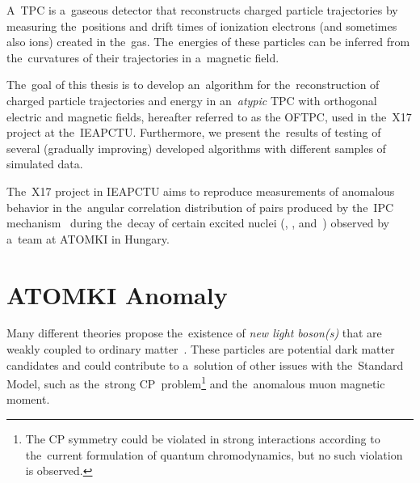\setcounter{equation}{0}
\setcounter{figure}{0}
\renewcommand{\theequation}{\thechapter.\arabic{equation}}
\renewcommand{\thefigure}{\thechapter.\arabic{figure}}
	A~\ac{TPC}\red{~[refs]} is a~gaseous detector that reconstructs charged particle trajectories by measuring the~positions and drift times of ionization electrons (and sometimes also ions) created in the~gas. The~energies of these particles can be inferred from the~curvatures of their trajectories in a~magnetic field.
	
	The~goal of this thesis is to develop an~algorithm for the~reconstruction of charged particle trajectories and energy in an~\emph{atypic} \ac{TPC} with orthogonal electric and magnetic fields, hereafter referred to as the \ac{OFTPC}, used in the~X17 project at the~\ac{IEAPCTU}. Furthermore, we present the~results of testing of several (gradually improving) developed algorithms with different samples of simulated data.
	
	The~X17 project in \ac{IEAPCTU} aims to reproduce measurements of anomalous behavior in the~angular correlation distribution of pairs produced by the~\ac{IPC} mechanism~\cite{IPC} during the~decay of certain excited nuclei (, , and~) observed by a~team at ATOMKI in Hungary.
	
	
	\section{ATOMKI Anomaly}
	\label{sec:ATOMKI}
		Many different theories propose the~existence of \emph{new light boson(s)} that are weakly coupled to ordinary matter~\cite{dark}. These particles are potential dark matter candidates and could contribute to a~solution of other issues with the~Standard Model, such as the~strong CP~problem\footnote{The CP symmetry could be violated in strong interactions according to the~current formulation of quantum chromodynamics, but no such violation is observed.} and the~anomalous muon magnetic moment.
		
